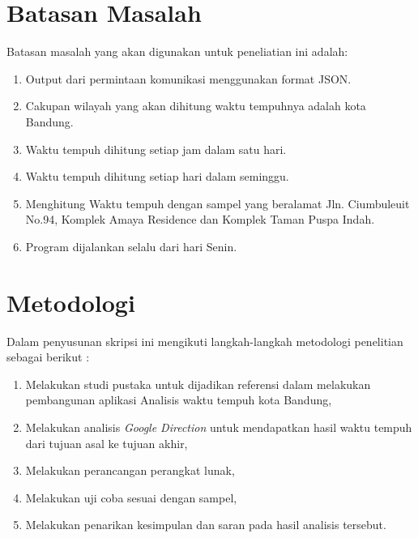 \section{Batasan Masalah}
\label{sec:batasan}
Batasan masalah yang akan digunakan untuk peneliatian ini adalah:
\begin{enumerate}
	\item Output dari permintaan komunikasi menggunakan format JSON.
	\item Cakupan wilayah yang akan dihitung waktu tempuhnya adalah kota Bandung.
	\item Waktu tempuh dihitung setiap jam dalam satu hari.
	\item Waktu tempuh dihitung setiap hari dalam seminggu.
	\item Menghitung Waktu tempuh dengan sampel yang beralamat Jln. Ciumbuleuit No.94, Komplek Amaya Residence dan Komplek Taman Puspa Indah.
	\item Program dijalankan selalu dari hari Senin.
\end{enumerate}

\section{Metodologi}
\label{sec:metlit}
Dalam penyusunan skripsi ini mengikuti langkah-langkah metodologi penelitian sebagai berikut :
\begin{enumerate}
	\item Melakukan studi pustaka untuk dijadikan referensi dalam melakukan pembangunan aplikasi Analisis waktu tempuh kota Bandung,
	\item Melakukan analisis \textit{Google Direction} untuk mendapatkan hasil waktu tempuh dari tujuan asal ke tujuan akhir,
	\item Melakukan perancangan perangkat lunak,
	\item Melakukan uji coba sesuai dengan sampel,
	\item Melakukan penarikan kesimpulan dan saran pada hasil analisis tersebut.
\end{enumerate}


